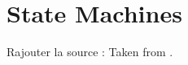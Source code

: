 \chapter{State Machines}
\label{app:state_machine}

Rajouter la source : Taken from \cite{hannotier2019indoor}.